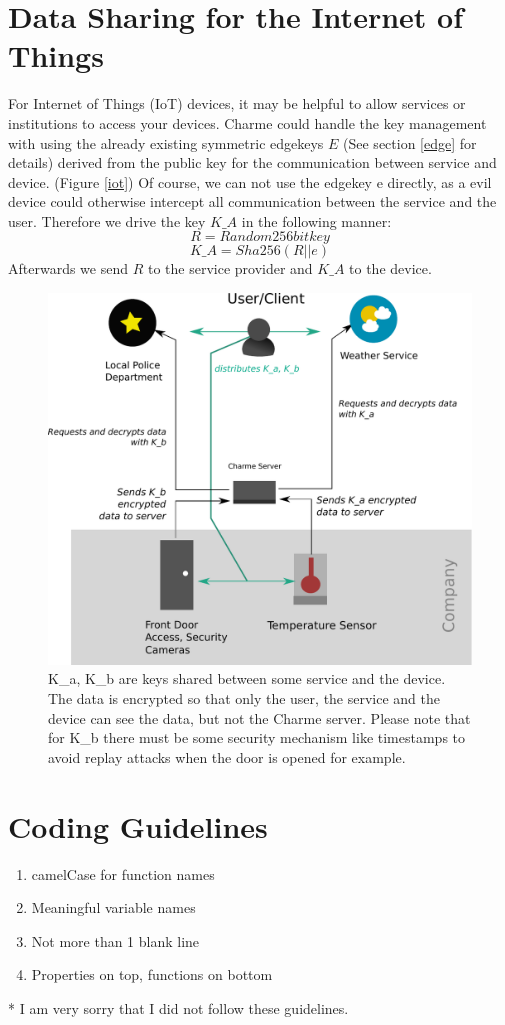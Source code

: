 \documentclass{scrartcl}
\begin{document}
  \section{Data Sharing for the Internet of Things}
  For Internet of Things (IoT) devices, it may be helpful to allow services or institutions to access your devices. Charme could handle the key management with using the already existing symmetric edgekeys $E$ (See section \ref{edge} for details) derived from the public key for the communication between service and device. (Figure \ref{iot})
Of course, we can not use the edgekey e directly, as a evil device could 
otherwise intercept all communication between the service and the user.
Therefore we drive the key $K\_A$ in the following manner:
$$
R = Random 256bit key
$$
$$
K\_A = Sha256(R || e)
$$
Afterwards we send $R$ to the service provider and $K\_A $ to the device.
\begin{figure}[ht]
	\centering
  \includegraphics[width=120mm]{illustrations/iot.pdf}
	\caption{K\_a, K\_b are keys shared between some service and the device. The data is encrypted so that only the user, the service and the device can see the data, but not the Charme server. Please note that for K\_b there must be some security mechanism  like timestamps to avoid replay attacks when the door is opened for example. \label{iot} }
	\label{figContext}
\end{figure}
  
\section{Coding Guidelines}
\begin{enumerate}
\item camelCase for function names
\item Meaningful variable names
\item Not more than 1 blank line
\item Properties on top, functions on bottom
\end{enumerate}
* I am very sorry that I did not follow these guidelines.
\end{document}
